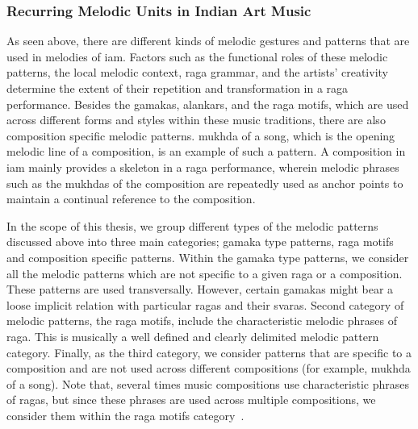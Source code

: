 \subsubsection{Recurring Melodic Units in Indian Art Music}
\label{sec:recurring_melodic_patterns_iam}

As seen above, there are different kinds of melodic gestures and patterns that are used in melodies of \gls{iam}. Factors such as the functional roles of these melodic patterns, the local melodic context, \gls{raga} grammar, and the artists' creativity determine the extent of their repetition and transformation in a \gls{raga} performance. Besides the \glspl{gamaka}, \glspl{alankar}, and the \gls{raga} motifs, which are used across different forms and styles within these music traditions, there are also composition specific melodic patterns. \Gls{mukhda} of a song, which is the opening melodic line of a composition, is an example of such a pattern. A composition in \gls{iam} mainly provides a skeleton in a \gls{raga} performance, wherein melodic phrases such as the \glspl{mukhda} of the composition are repeatedly used as anchor points to maintain a continual reference to the composition.%

In the scope of this thesis, we group different types of the melodic patterns discussed above into three main categories; \gls{gamaka} type patterns, \gls{raga} motifs and composition specific patterns. Within the \gls{gamaka} type patterns, we consider all the melodic patterns which are not specific to a given \gls{raga} or a composition. These patterns are used transversally. However, certain \glspl{gamaka} might bear a loose implicit relation with particular \glspl{raga} and their \glspl{svara}. Second category of melodic patterns, the \gls{raga} motifs, include the characteristic melodic phrases of \gls{raga}. This is musically a well defined and clearly delimited melodic pattern category. Finally, as the third category, we consider patterns that are specific to a composition and are not used across different compositions (for example, \gls{mukhda} of a song). Note that, several times music compositions use characteristic phrases of \glspl{raga}, but since these phrases are used across multiple compositions, we consider them within the \gls{raga} motifs category~\citep{meer1980hindustani,Bagchee1998}.


